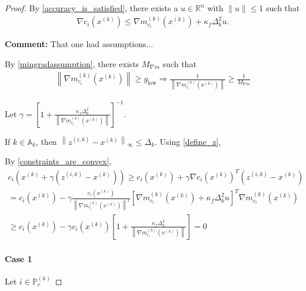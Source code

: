 \documentclass{article}
\newenvironment{comment}
  {\par\medskip
   \color{red}%
   \begin{framed}
   \textbf{Comment: }\ignorespaces}
 {\end{framed}
  \medskip}
\theoremstyle{case}
\numberwithin{theorem}{subsection}
\newcommand{\activeconstraintsk}{{\mathbb A_{k}}}
\newcommand{\dk}{\Delta_k}
\newcommand{\gmcik}{{\nabla m_{c_i}^{(k)}\left(\xk\right)}}
\newcommand{\gmcil}{{\nabla m_{c_i}^{(l)}\left(\xl\right)}}
\newcommand{\mcil}{{{m}^{(l)}_{c_i}}}
\newcommand{\mingrad}{{ g_{\textrm{low}} }}
\newcommand{\Rn}{\mathbb R^n}
\newcommand{\xk}{x^{(k)}}
\newcommand{\xl}{{x^{(l)}}}
\newcommand{\zik}{{z^{(i, k)}}}
\newcommand{\projkl}{{p^{(k,l)}}}
\newcommand{\truefeasible}{{F_c}}
\newcommand{\trueactiveprojk}{{\mathbb P_c^{(k)}}}
\newcommand{\maxmodelgrad}{{M_{\nabla m}}}
\begin{document}
\begin{proof}

By \cref{accuracy_is_satisfied}, there exists a $u \in \Rn$ with $\|u\| \le 1$ such that
\begin{align*}
\nabla c_i\left(\xk\right) \le \gmcik + \kappa_f \dk^2 u.
\end{align*}
\begin{comment}
That one had assumptions...
\end{comment}
By \cref{mingradassumption}, there exists $\maxmodelgrad$ such that
\begin{align*}
\left\|\gmcik\right\| \ge \mingrad
\Longrightarrow  \frac{1}{\left\|\gmcik\right\|} \ge \frac 1 {\maxmodelgrad}
\end{align*}

Let $\gamma = \left[1 + \frac{\kappa_f \dk^2}{\left\|\gmcik\right\|}\right]^{-1}$.


If $k \in \activeconstraintsk$, then $\left\|\zik - \xk\right\|_{\infty} \le \dk$.
Using \cref{define_z},


By \cref{constraints_are_convex}, 
\begin{align*}
c_i\left(\xk + \gamma\left(\zik - \xk\right) \right) \ge c_i\left(\xk\right) + \gamma\nabla c_i\left(\xk\right)^T\left(\zik - \xk\right) \\
= c_i\left(\xk\right) - \gamma\frac{c_i\left(\xk\right)}{\left\|\gmcik\right\|^2} \left[\gmcik + \kappa_f \dk^2 u \right]^T\gmcik \\
\ge c_i\left(\xk\right) - \gamma c_i\left(\xk\right)\left[1 + \frac{\kappa_f \dk^2}{\left\|\gmcik\right\|}\right]
= 0
\end{align*}

\paragraph{Case 1}

Let $i \in \trueactiveprojk$



\end{proof}
\end{document}
